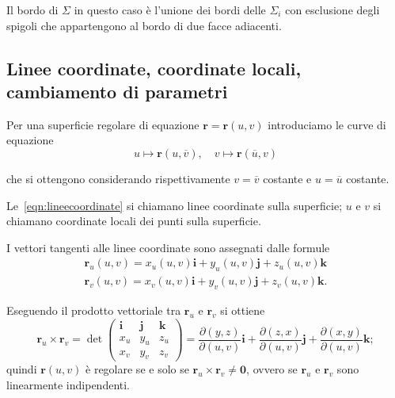 \documentclass[a4paper]{book}
\numberwithin{equation}{section}
\theoremstyle{plain}
\theoremstyle{definition}
\theoremstyle{remark}
\renewcommand{\vec}{\boldsymbol}
\theoremstyle{example}
\begin{document}
Il bordo di $\Sigma$ in questo caso è l'unione dei bordi delle $\Sigma_i$ con esclusione degli spigoli che appartengono al bordo di due facce adiacenti.

\subsection{Linee coordinate, coordinate locali, cambiamento di parametri}
Per una superficie regolare di equazione $\vec{r} = \vec{r}(u, v)$ introduciamo le curve di equazione
	\begin{equation}
		\label{eqn:lineecoordinate}
		u \mapsto \vec{r}(u, \overline{v}), \quad v \mapsto \vec{r}(\overline{u}, v)
	\end{equation}

che si ottengono considerando rispettivamente $v = \overline{v}$ costante e $u = \overline{u}$ costante.

Le~\eqref{eqn:lineecoordinate} si chiamano linee coordinate sulla superficie; $u$ e $v$ si chiamano coordinate locali dei punti sulla superficie.

I vettori tangenti alle linee coordinate sono assegnati dalle formule
	\begin{gather*}
		\vec{r}_u(u, v) = x_u(u, v) \vec{i}+ y_u(u, v)\vec{j} + z_u(u, v)\vec{k} \\
		\vec{r}_v(u, v) = x_v(u,v)\vec{i}+y_v(u,v)\vec{j}+z_v(u,v)\vec{k}.
	\end{gather*}

Eseguendo il prodotto vettoriale tra $\vec{r}_u$ e $\vec{r}_v$ si ottiene
	\begin{equation*}
		\vec{r}_u \times \vec{r}_v = \det \begin{pmatrix}
		\vec{i} & \vec{j} & \vec{k} \\
		x_u & y_u & z_u \\
		x_v & y_v & z_v
	\end{pmatrix} = \frac{\partial (y, z)}{\partial (u, v)}\vec{i} + \frac{\partial(z, x)}{\partial (u,v)}\vec{j} + \frac{\partial (x, y)}{\partial (u, v)}\vec{k};
	\end{equation*}
	quindi $\vec{r}(u, v)$ è regolare se e solo se $\vec{r}_u \times \vec{r}_v \ne \vec{0}$, ovvero se $\vec{r}_u$ e $\vec{r}_v$ sono linearmente indipendenti.
\end{document}
